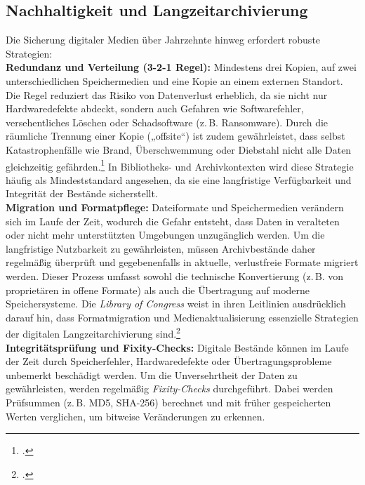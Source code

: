 \documentclass[12pt,a4paper]{report}
\begin{document}
  \subsection{Nachhaltigkeit und Langzeitarchivierung}  
  Die Sicherung digitaler Medien über Jahrzehnte hinweg erfordert robuste Strategien:
  \\
  \newline
  \textbf{Redundanz und Verteilung (3-2-1 Regel):}  
  Mindestens drei Kopien, auf zwei unterschiedlichen Speichermedien und eine Kopie an einem externen Standort. 
  Die Regel reduziert das Risiko von Datenverlust erheblich, da sie nicht nur Hardwaredefekte abdeckt, sondern auch Gefahren wie Softwarefehler, versehentliches Löschen oder Schadsoftware (z.\,B. Ransomware).
  Durch die räumliche Trennung einer Kopie („offsite“) ist zudem gewährleistet, dass selbst Katastrophenfälle wie Brand, Überschwemmung oder Diebstahl nicht alle Daten gleichzeitig gefährden.\footcite[Vgl.][siehe Backupstrategien]{wikipedia_datensicherung}
  In Bibliotheks- und Archivkontexten wird diese Strategie häufig als Mindeststandard angesehen, da sie eine langfristige Verfügbarkeit und Integrität der Bestände sicherstellt.  
  \\
  \newline
  \textbf{Migration und Formatpflege:}  
  Dateiformate und Speichermedien verändern sich im Laufe der Zeit, wodurch die Gefahr entsteht, dass Daten in veralteten oder nicht mehr unterstützten Umgebungen unzugänglich werden.  
  Um die langfristige Nutzbarkeit zu gewährleisten, müssen Archivbestände daher regelmäßig überprüft und gegebenenfalls in aktuelle, verlustfreie Formate migriert werden.  
  Dieser Prozess umfasst sowohl die technische Konvertierung (z.\,B. von proprietären in offene Formate) als auch die Übertragung auf moderne Speichersysteme.  
  Die \emph{Library of Congress} weist in ihren Leitlinien ausdrücklich darauf hin, dass Formatmigration und Medienaktualisierung essenzielle Strategien der digitalen Langzeitarchivierung sind.\footcite[Vgl.][siehe Sustainability Factors]{loc_formats}  
  \\
  \newline
  \textbf{Integritätsprüfung und Fixity-Checks:}  
  Digitale Bestände können im Laufe der Zeit durch Speicherfehler, Hardwaredefekte oder Übertragungsprobleme unbemerkt beschädigt werden.  
  Um die Unversehrtheit der Daten zu gewährleisten, werden regelmäßig \emph{Fixity-Checks} durchgeführt.  
  Dabei werden Prüfsummen (z.\,B. \ac{MD5}, \ac{SHA-256}) berechnet und mit früher gespeicherten Werten verglichen, um bitweise Veränderungen zu erkennen.  
\end{document}
